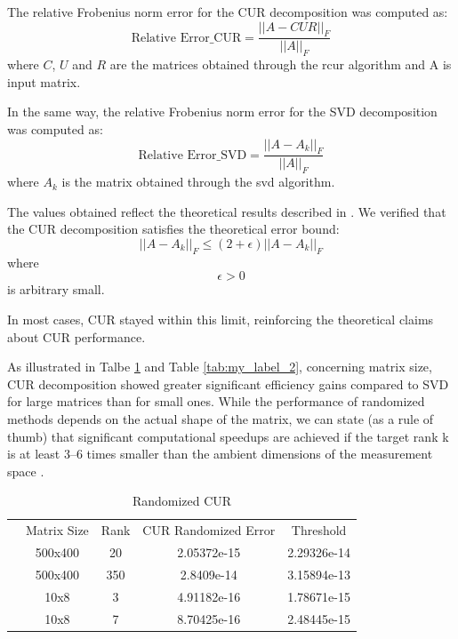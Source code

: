 \documentclass[11pt,a4paper]{article}
\begin{document}
The relative Frobenius norm error for the CUR decomposition was computed as: 
\[\text{Relative Error\_CUR} = \frac{||A-CUR||_F}{||A||_F}\]
where $ C $, $ U $ and $ R $ are the matrices obtained through the rcur algorithm and A is input matrix.

In the same way, the relative Frobenius norm error for the SVD decomposition was computed as: 
\[\text{Relative Error\_SVD} = \frac{||A-A_k||_F}{||A||_F}\]
where $ A_k $ is the matrix obtained through the svd algorithm.

The values obtained reflect the theoretical results described in \cite{doi:10.1073/pnas.0803205106}. We verified that the CUR decomposition satisfies the theoretical error bound:
\[{||A-A_k||_F} \leq (2+\epsilon)||A-A_k||_F\]
where \[\epsilon > 0 \] is arbitrary small.

In most cases, CUR stayed within this limit, reinforcing the theoretical claims about CUR performance.

As illustrated in Talbe \ref{tab:my_label_1} and Table \ref{tab:my_label_2}, concerning matrix size, CUR decomposition showed greater significant efficiency gains compared to SVD for large matrices than for small ones.
While the performance of randomized methods depends on the actual shape of the matrix, we can state (as a rule of thumb) that significant computational speedups are achieved if the target rank k is at least 3–6 times smaller than the ambient dimensions of the measurement space \cite{Erichson_2019}.



\begin{table}
    \centering
    \begin{tabular}{ccccc}
         & Matrix Size & Rank & CUR Randomized Error  & Threshold   \\
         & 500x400     & 20   & 2.05372e-15           & 2.29326e-14 \\
         & 500x400     & 350  & 2.8409e-14            & 3.15894e-13 \\
         & 10x8        & 3    & 4.91182e-16           & 1.78671e-15 \\
         & 10x8        & 7    & 8.70425e-16           & 2.48445e-15 \\
    \end{tabular}
    \caption{Randomized CUR}
    \label{tab:my_label_1}
\end{table}
\end{document}
